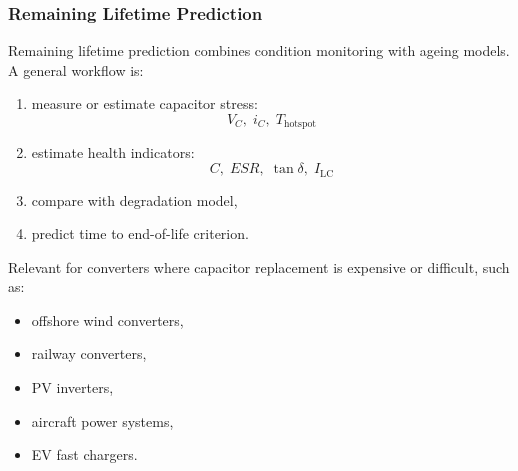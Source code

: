 \begin{frame}
\frametitle{Remaining Lifetime Prediction}
Remaining lifetime prediction combines condition monitoring with ageing models. A general workflow is:

\begin{enumerate}
    \item measure or estimate capacitor stress:
    \[
        V_C,\; i_C,\; T_{\mathrm{hotspot}}
    \]

    \item estimate health indicators:
    \[
        C,\; ESR,\; \tan\delta,\; I_{\mathrm{LC}}
    \]

    \item compare with degradation model,

    \item predict time to end-of-life criterion.
\end{enumerate}
Relevant for converters where capacitor replacement is expensive or difficult, such as:
\begin{itemize}
    \item offshore wind converters,
    \item railway converters,
    \item PV inverters,
    \item aircraft power systems,
    \item EV fast chargers.
\end{itemize}

\end{frame}


